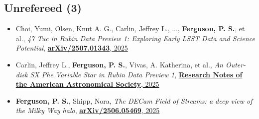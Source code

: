 \subsection{Unrefereed  (3)}
\begin{itemize}[itemsep=1pt]
    \item {Choi}, Yumi, {Olsen}, Knut A. G., {Carlin}, Jeffrey L., ..., \textbf{Ferguson, P. S.}, et al., \textit{{47 Tuc in Rubin Data Preview 1: Exploring Early LSST Data and Science Potential}}, \href{https://ui.adsabs.harvard.edu/abs/2025arXiv250701343C}{\textbf{arXiv/2507.01343}, 2025}
    \item {Carlin}, Jeffrey L., \textbf{Ferguson, P. S.}, {Vivas}, A. Katherina, et al., \textit{{An Outer-disk SX Phe Variable Star in Rubin Data Preview 1}}, \href{https://ui.adsabs.harvard.edu/abs/2025RNAAS...9..161C}{\textbf{Research Notes of the American Astronomical Society}, 2025}
    \item \textbf{Ferguson, P. S.}, {Shipp}, Nora, \textit{{The DECam Field of Streams: a deep view of the Milky Way halo}}, \href{https://ui.adsabs.harvard.edu/abs/2025arXiv250605469F}{\textbf{arXiv/2506.05469}, 2025}
\end{itemize}
